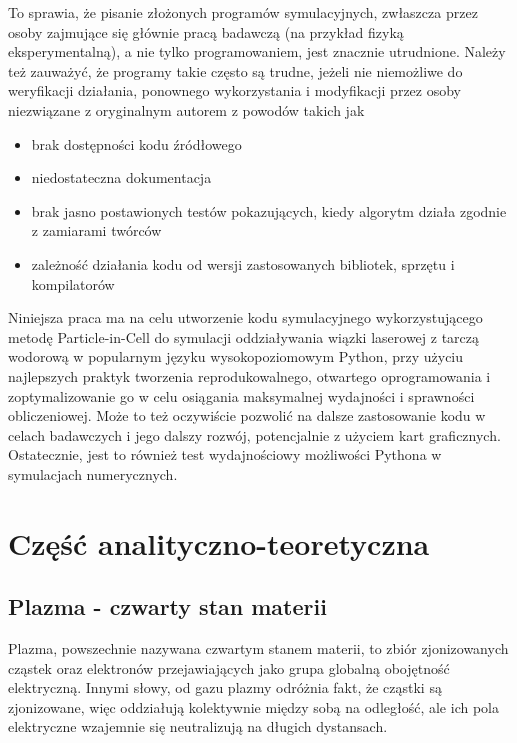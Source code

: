     To sprawia, że pisanie złożonych programów symulacyjnych, zwłaszcza przez osoby
    zajmujące się głównie pracą badawczą (na przykład fizyką eksperymentalną), a nie
    tylko programowaniem,
    jest znacznie utrudnione. Należy też zauważyć, że programy takie często są
    trudne, jeżeli nie niemożliwe do weryfikacji działania, ponownego wykorzystania
    i modyfikacji przez osoby niezwiązane z oryginalnym autorem z powodów takich jak
    \begin{itemize}
        \item brak dostępności kodu źródłowego
        \item niedostateczna dokumentacja
        \item brak jasno postawionych testów pokazujących, kiedy algorytm działa zgodnie z zamiarami twórców
        \item zależność działania kodu od wersji zastosowanych bibliotek, sprzętu i kompilatorów
    \end{itemize}

    Niniejsza praca ma na celu utworzenie kodu symulacyjnego wykorzystującego metodę Particle-in-Cell
    do symulacji oddziaływania wiązki laserowej z tarczą wodorową w popularnym języku
    wysokopoziomowym Python, przy użyciu najlepszych praktyk tworzenia reprodukowalnego, otwartego oprogramowania
    i zoptymalizowanie go w celu osiągania maksymalnej wydajności i sprawności obliczeniowej. Może to też oczywiście
    pozwolić na dalsze
    zastosowanie kodu w celach badawczych i jego dalszy rozwój, potencjalnie z użyciem kart graficznych.
    Ostatecznie, jest to również test wydajnościowy możliwości Pythona w symulacjach 
    numerycznych.

    \section[Część analityczno-teoretyczna]{Część analityczno-teoretyczna} %

    \subsection{Plazma - czwarty stan materii}

    Plazma, powszechnie nazywana czwartym stanem materii, to zbiór zjonizowanych 
    cząstek oraz elektronów przejawiających jako grupa globalną obojętność elektryczną. Innymi słowy, od gazu plazmy
    odróżnia fakt, że cząstki są zjonizowane, więc oddziałują kolektywnie między sobą na odległość,
    ale ich pola elektryczne wzajemnie się neutralizują na długich dystansach.

